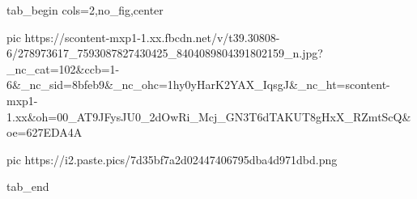  
 
 
 
 

\ifcmt
  tab_begin cols=2,no_fig,center

     pic https://scontent-mxp1-1.xx.fbcdn.net/v/t39.30808-6/278973617_7593087827430425_8404089804391802159_n.jpg?_nc_cat=102&ccb=1-6&_nc_sid=8bfeb9&_nc_ohc=1hy0yHarK2YAX_IqsgJ&_nc_ht=scontent-mxp1-1.xx&oh=00_AT9JFysJU0_2dOwRi_Mcj_GN3T6dTAKUT8gHxX_RZmtScQ&oe=627EDA4A

		 pic https://i2.paste.pics/7d35bf7a2d02447406795dba4d971dbd.png

  tab_end
\fi
